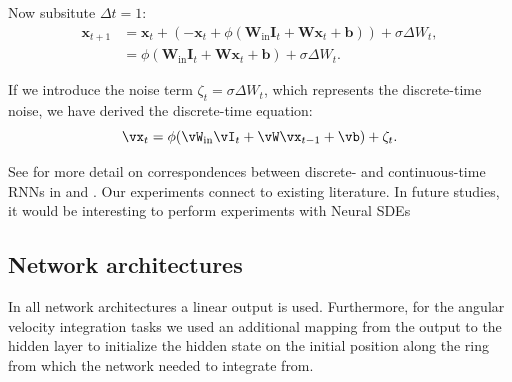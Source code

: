 \documentclass{article} %
\newcounter{ct}
\newcommand{\win}{\vW_{\text{in}}}
\newcommand{\wout}{\vW_{\text{out}}}
\newcommand{\bout}{\vb_{\text{out}}}
\theoremstyle{definition}
\theoremstyle{remark}
\begin{document}
Now subsitute \(\Delta t = 1\):
\begin{align}
 \mathbf{x}_{t+1} &= \mathbf{x}_t + \left( -\mathbf{x}_t + \phi(\mathbf{W}_{\text{in}} \mathbf{I}_t + \mathbf{W} \mathbf{x}_t + \mathbf{b}) \right) + \sigma \Delta W_t, \\
 &= \phi(\mathbf{W}_{\text{in}} \mathbf{I}_t + \mathbf{W} \mathbf{x}_t + \mathbf{b}) + \sigma \Delta W_t.
 \end{align}

If we introduce the noise term \(\zeta_t = \sigma \Delta W_t\), which represents the discrete-time noise, we have derived the discrete-time equation: \[ \vx_t = \phi(\win \vI_t + \vW \vx_{t-1} + \vb) + \zeta_t. \]

See for more detail on correspondences between discrete- and continuous-time RNNs in \citep{monfared2020transformation} and \citep{ozaki2012time}.
Our experiments connect to existing literature. In future studies, it would be interesting to perform experiments with Neural SDEs \citep{tzen2019neural}


%
%

\subsection{Network architectures}
In all network architectures a linear output is used.
Furthermore, for the angular velocity integration tasks we used an additional mapping from the output to the hidden layer to initialize the hidden state on the initial position along the ring from which the network needed to integrate from.
\end{document}
